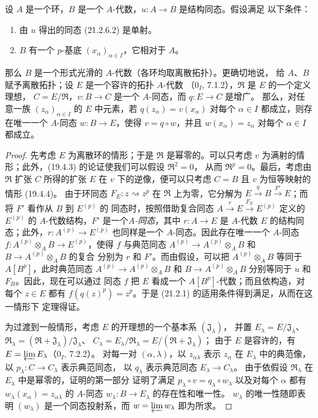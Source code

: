\begin{theorem}[21.2.7]
\label{0.21.2.7-fr}
设 $A$ 是一个环，$B$ 是一个 $A$-代数，$u:A\to B$ 是结构同态。假设满足
以下条件：
\begin{enumerate}
  \item[(i)] 由 $u$ 得出的同态 (21.2.6.2) 是单射。
  \item[(ii)] $B$ 有一个 $p$-基底 $(x_\alpha)_{\alpha\in I}$，它相对于 $A$。
\end{enumerate}
那么 $B$ 是一个形式光滑的 $A$-代数（各环均取离散拓扑）。更确切地说，
给 $A$、$B$ 赋予离散拓扑；设 $E$ 是一个容许的拓扑 $A$-代数
（0$_I$, 7.1.2），$\mathfrak R$ 是 $E$ 的一个定义理想，
$C=E/\mathfrak R$，$v:B\to C$ 是一个 $A$-同态，而 $q:E\to C$ 是增广。
那么，对任意一族 $(z_\alpha)_{\alpha\in I}$ 的 $E$ 中元素，若
$q(z_\alpha)=v(x_\alpha)$ 对每个 $\alpha\in I$ 都成立，则存在唯一一个
$A$-同态 $w:B\to E$，使得 $v=q\circ w$，并且
$w(x_\alpha)=z_\alpha$ 对每个 $\alpha\in I$ 都成立。
\end{theorem}

\begin{proof}
先考虑 $E$ 为离散环的情形；于是 $\mathfrak R$ 是幂零的。可以只考虑 $v$
为满射的情形；此外，(19.4.3) 的论证使我们可以假设 $\mathfrak R^2=0$，
从而 $\mathfrak R^p=0$。最后，考虑由 $\mathfrak R$ 扩张 $C$ 所得的扩张 $E$
在 $v$ 下的逆像，便可以只考虑 $C=B$ 且 $v$ 为恒等映射的情形 (19.4.4)。
由于环同态 $F_E:z\rightsquigarrow z^p$ 在 $\mathfrak R$ 上为零，它分解为
$E\xrightarrow q B\xrightarrow{F'}E$；而将 $F'$ 看作从 $B$ 到 $E^{(p)}$ 的
同态时，按照借助复合同态 $A\xrightarrow r E\xrightarrow{F_E}E^{(p)}$
定义的 $E^{(p)}$ 的 $A$-代数结构，$F'$ 是一个\emph{$A$-同态}，其中
$r:A\to E$ 是 $A$-代数 $E$ 的结构同态；此外，$r:A^{(p)}\to E^{(p)}$
也同样是一个 $A$-同态。因此存在唯一一个 $A$-同态
$f:A^{(p)}\otimes_A B\to E^{(p)}$，使得 $f$ 与典范同态
$A^{(p)}\to A^{(p)}\otimes_A B$ 和 $B\to A^{(p)}\otimes_A B$ 的复合
分别为 $r$ 和 $F'$。而由假设，可以把 $A^{(p)}\otimes_A B$ 等同于
$A[B^p]$，此时典范同态 $A^{(p)}\to A^{(p)}\otimes_A B$ 和
$B\to A^{(p)}\otimes_A B$ 分别等同于 $u$ 和 $F_B$。因此，现在可以通过
同态 $f$ 把 $E$ 看成一个 $A[B^p]$-代数；而且依构造，对每个 $z\in E$
都有 $f(q(z)^p)=z^p$。于是 (21.2.1) 的适用条件得到满足，从而在这一情形下
定理得证。

为过渡到一般情形，考虑 $E$ 的开理想的一个基本系 $(\mathfrak J_\lambda)$，
并置 $E_\lambda=E/\mathfrak J_\lambda$、
$\mathfrak R_\lambda=(\mathfrak R+\mathfrak J_\lambda)/\mathfrak J_\lambda$、
$C_\lambda=E_\lambda/\mathfrak R_\lambda=E/(\mathfrak R+\mathfrak J_\lambda)$；
由于 $E$ 是容许的，有 $E=\varprojlim E_\lambda$（0$_I$, 7.2.2）。
对每一对 $(\alpha,\lambda)$，以 $z_{\alpha\lambda}$ 表示 $z_\alpha$ 在
$E_\lambda$ 中的典范像，以 $p_\lambda:C\to C_\lambda$ 表示典范同态，
以 $q_\lambda$ 表示典范同态 $E_\lambda\to C_\lambda$。
由于依假设 $\mathfrak R_\lambda$ 在 $E_\lambda$ 中是幂零的，证明的第一部分
证明了满足 $p_\lambda\circ v=q_\lambda\circ w_\lambda$ 以及对每个
$\alpha$ 都有 $w_\lambda(x_\alpha)=z_{\alpha\lambda}$ 的 $A$-同态
$w_\lambda:B\to E_\lambda$ 的存在性和唯一性。
$w_\lambda$ 的唯一性随即表明 $(w_\lambda)$ 是一个同态投射系，而
$w=\varprojlim w_\lambda$ 即为所求。
\end{proof}

